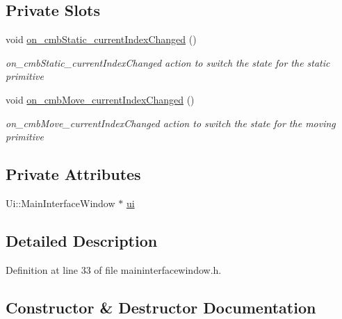 \subsection*{Private Slots}
\begin{DoxyCompactItemize}
\item 
void \hyperlink{class_main_interface_window_a380d5adfd4f2f434a4dbceba61a3223f}{on\+\_\+cmb\+Static\+\_\+current\+Index\+Changed} ()
\begin{DoxyCompactList}\small\item\em on\+\_\+cmb\+Static\+\_\+current\+Index\+Changed action to switch the state for the static primitive \end{DoxyCompactList}\item 
void \hyperlink{class_main_interface_window_a88d3fa446248d7d4c054cdf9e228571c}{on\+\_\+cmb\+Move\+\_\+current\+Index\+Changed} ()
\begin{DoxyCompactList}\small\item\em on\+\_\+cmb\+Move\+\_\+current\+Index\+Changed action to switch the state for the moving primitive \end{DoxyCompactList}\end{DoxyCompactItemize}
\subsection*{Private Attributes}
\begin{DoxyCompactItemize}
\item 
Ui\+::\+Main\+Interface\+Window $\ast$ \hyperlink{class_main_interface_window_afe3aae95d697ade063b0e4ad517655b9}{ui}
\end{DoxyCompactItemize}


\subsection{Detailed Description}


Definition at line 33 of file maininterfacewindow.\+h.



\subsection{Constructor \& Destructor Documentation}
\mbox{\label{class_main_interface_window_a8b5aa367c51aca1da2c4e54ddf1571c1}} 
